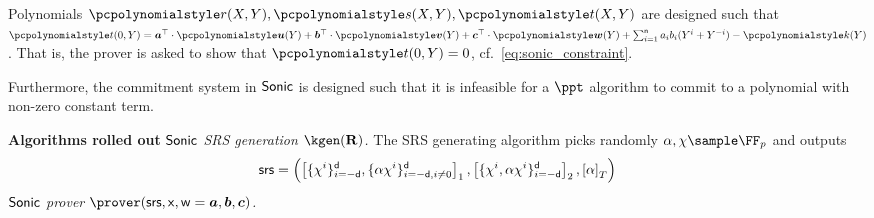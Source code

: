 \documentclass[runningheads,11pt]{llncs}
\let\spvec\vec
\let\vec\accentvec
\let\spvec\vec
\let\vec\spvec
\def\vec#1{\mathchoice{\mbox{\boldmath$\displaystyle#1$}}
  {\mbox{\boldmath$\textstyle#1$}} {\mbox{\boldmath$\scriptstyle#1$}}
  {\mbox{\boldmath$\scriptscriptstyle#1$}}}
\newcommand{\oursubsub}[1] {\smallskip\noindent\textbf{#1}}
\newcommand{\ourpar}[1] {\smallskip\noindent\emph{#1}}
\begin{document}
Polynomials $\p{r} (X, Y), \p{s} (X, Y), \p{t} (X, Y)$ are designed such that
$\p{t} (0, Y) = \vec{a}^\top \cdot \vec{\p{u}} (Y) + \vec{b}^\top \cdot
\vec{\p{v}} (Y) + \vec{c}^\top \cdot \vec{\p{w}} (Y) + \sum_{i =
  1}^{\multconstr} a_i b_i (Y^i + Y^{-i}) - \p{k} (Y) $. That is, the prover is
asked to show that $\p{t} (0, Y) = 0$, cf.~\cref{eq:sonic_constraint}.

Furthermore, the commitment system in ${\textnormal{\textsf{Sonic}}}$ is designed such that it is
infeasible for a $\ppt$ algorithm to commit to a polynomial with non-zero
constant term.

\oursubsub{Algorithms rolled out}
\ourpar{${\textnormal{\textsf{Sonic}}}$ SRS generation $\kgen(\REL)$.} The SRS generating algorithm picks
randomly $\alpha, \chi \sample \FF_p$ and outputs
	\[
      \mathsf{srs} = \left( \left[\{\chi^i\}_{i = -\mathsf{d}}^{\mathsf{d}},
          \{\alpha \chi^i\}_{i = -\mathsf{d}, i \neq 0}^{\mathsf{d}}\right]_{1},
        \left[\{\chi^i, \alpha \chi^i\}_{i = - \mathsf{d}}^{\mathsf{d}}\right]_{2},
        \left[\alpha\right]_{T} \right)
	\]
\ourpar{${\textnormal{\textsf{Sonic}}}$ prover $\prover(\srs, \inp, \wit=\va, \vb, \vc)$.}
\end{document}
